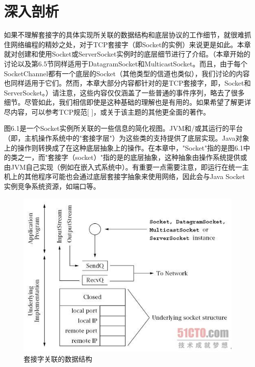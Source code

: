 \chapter{深入剖析} 

	如果不理解套接字的具体实现所关联的数据结构和底层协议的工作细节，就很难抓住网络编程的精妙之处，对于TCP套接字（即Socket的实例）来说更是如此。本章就对创建和使用Socket或ServerSocket实例时的底层细节进行了介绍。（本章开始的讨论以及第6.5节同样适用于DatagramSocket和MulticastSocket。而且，由于每个SocketChannel都有一个底层的Socket（其他类型的信道也类似），我们讨论的内容也同样适用于它们。然而，本章大部分内容都针对的是TCP套接字，即，Socket和ServerSocket。）请注意，这些内容仅仅涵盖了一些普通的事件序列，略去了很多细节。尽管如此，我们相信即使是这种基础的理解也是有用的。如果希望了解更详尽内容，可以参考TCP规范[ ]，或关于该主题的其他更全面的著作。

	图6.1是一个Socket实例所关联的一些信息的简化视图。JVM和/或其运行的平台（即，主机操作系统中的"套接字层"）为这些类的支持提供了底层实现。Java对象上的操作则转换成了在这种底层抽象上的操作。在本章中，"Socket"指的是图6.1中的类之一，而"套接字（socket）"指的是的底层抽象，这种抽象由操作系统提供或由JVM自己实现（例如在嵌入式系统中）。有重要一点需要注意，即运行在统一主机上的其他程序可能也会通过底层套接字抽象来使用网络，因此会与Java Socket实例竞争系统资源，如端口等。

	\clearpage

	\begin{figure}[htbp]%
		\centering
		\includegraphics[scale=.6]{img/06.01.jpg}
		\caption{套接字关联的数据结构}
		\label{fig:data.struct.of.socket}
	\end{figure}

